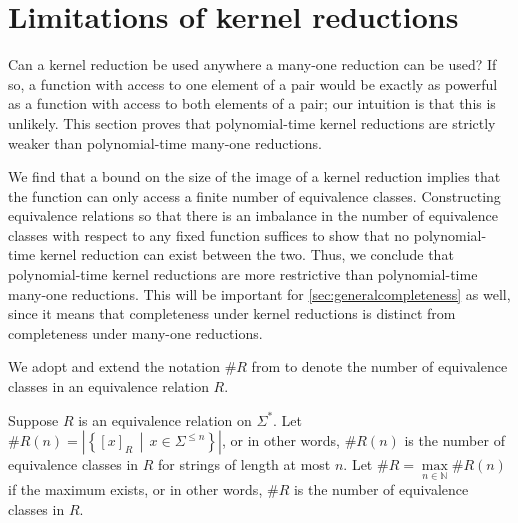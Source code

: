 \section{Limitations of kernel reductions}\label{sec:limitations}
%
Can a kernel reduction be used anywhere a many-one reduction can be used?
If so, a function with access to one element of a pair would be exactly as powerful as a function with access to both elements of a pair; our intuition is that this is unlikely.
This section proves that polynomial-time kernel reductions are strictly weaker than polynomial-time many-one reductions.

%
We find that a bound on the size of the image of a kernel reduction implies that the function can only access a finite number of equivalence classes.
Constructing equivalence relations so that there is an imbalance in the number of equivalence classes with respect to any fixed function suffices to show that no polynomial-time kernel reduction can exist between the two.
Thus, we conclude that polynomial-time kernel reductions are more restrictive than polynomial-time many-one reductions.
This will be important for \autoref{sec:generalcompleteness} as well, since it means that completeness under kernel reductions is distinct from completeness under many-one reductions.

We adopt and extend the notation $\#R$ from \autocite{bcffm} to denote the number of equivalence classes in an equivalence relation $R$.

\begin{definition}%
  Suppose $R$ is an equivalence relation on $\Sigma^*$.
  Let $\#R(n) = \left|\left\{[x]_R \, \middle| \, x \in \Sigma^{\leq n}\right\}\right|$, or in other words, $\#R(n)$ is the number of equivalence classes in $R$ for strings of length at most $n$.
  Let $\#R = \max\limits_{n \in \mathbb{N}} \#R(n)$ if the maximum exists, or in other words, $\#R$ is the number of equivalence classes in $R$.
\end{definition}

